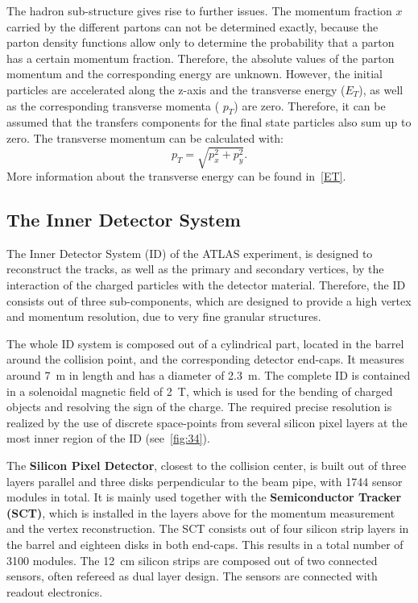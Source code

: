 The hadron sub-structure gives rise to further issues. The momentum fraction $x$ carried by the different partons can not be determined exactly, because the parton density functions allow only to determine the probability that a parton has a certain momentum fraction. Therefore, the absolute values of the parton momentum and the corresponding energy are unknown. 
However, the initial particles are accelerated along the z-axis and the transverse energy ($E_T$), as well as the corresponding transverse momenta ( $p_T$) are zero.
Therefore, it can be  assumed that the transfers components for the final state particles also sum up to zero.  The transverse momentum can be calculated with: 
 \begin{equation}
 p_T = \sqrt{p_x^2+p_y^2}.
 \end{equation}  
 More information about the transverse energy can be found in~\cref{ET}.        





\subsection{The Inner Detector System}\label{ID}
The Inner Detector System (ID) of the ATLAS experiment, is designed to reconstruct the tracks, as well as the primary and secondary vertices, by the interaction of the charged particles with the detector material. Therefore, the ID consists out of three sub-components, which are designed to provide a high vertex and momentum resolution, due to  very fine granular structures.

The whole ID system is composed out of a cylindrical part, located in the barrel around the collision point, and the corresponding detector end-caps. It measures around 7~m in length and has a diameter of 2.3~m. The complete ID is contained in a solenoidal magnetic field of 2~T, which is used for the bending of charged objects and resolving the sign of the charge. The required precise resolution is realized by the use of discrete space-points from several silicon pixel layers at the most inner region of the ID (see~\cref{fig:34}).

 The \textbf{Silicon Pixel Detector}, closest to the collision center, is built out of three layers parallel and three disks perpendicular to the beam pipe, with 1744 sensor modules in total. It is mainly used together with the \textbf{Semiconductor Tracker (SCT)}, which is installed in the layers above for the momentum measurement and the vertex reconstruction. The SCT consists out of four silicon strip layers in the barrel and  eighteen disks in both end-caps. This results in a total number of 3100 modules. The 12~cm silicon strips are composed out of two connected sensors, often refereed as dual layer design. The sensors are connected with readout electronics.


